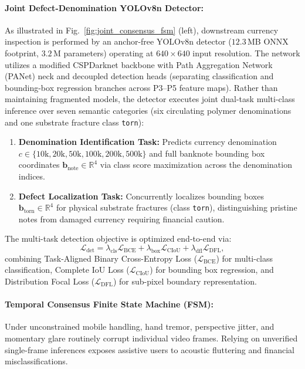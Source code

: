 \documentclass[final,5p,times,twocolumn,authoryear]{elsarticle}
\begin{document}
\paragraph{Joint Defect-Denomination YOLOv8n Detector:}
As illustrated in Fig.~\ref{fig:joint_consensus_fsm} (left), downstream currency inspection is performed by an anchor-free YOLOv8n detector ($12.3$\,MB ONNX footprint, $3.2$\,M parameters) operating at $640 \times 640$ input resolution. The network utilizes a modified CSPDarknet backbone with Path Aggregation Network (PANet) neck and decoupled detection heads (separating classification and bounding-box regression branches across P3--P5 feature maps). Rather than maintaining fragmented models, the detector executes joint dual-task multi-class inference over seven semantic categories (six circulating polymer denominations and one substrate fracture class \texttt{torn}):
\begin{enumerate}[label=(\roman*)]
    \item \textbf{Denomination Identification Task:} Predicts currency denomination $c \in \{10\text{k},\allowbreak 20\text{k},\allowbreak 50\text{k},\allowbreak 100\text{k},\allowbreak 200\text{k},\allowbreak 500\text{k}\}$ and full banknote bounding box coordinates $\mathbf{b}_{\text{note}} \in \mathbb{R}^4$ via class score maximization across the denomination indices.
    \item \textbf{Defect Localization Task:} Concurrently localizes bounding boxes $\mathbf{b}_{\text{torn}} \in \mathbb{R}^4$ for physical substrate fractures (class \texttt{torn}), distinguishing pristine notes from damaged currency requiring financial caution.
\end{enumerate}
The multi-task detection objective is optimized end-to-end via:
\begin{equation}
\mathcal{L}_{\text{det}} = \lambda_{\text{cls}} \mathcal{L}_{\text{BCE}} + \lambda_{\text{box}} \mathcal{L}_{\text{CIoU}} + \lambda_{\text{dfl}} \mathcal{L}_{\text{DFL}},
\end{equation}
combining Task-Aligned Binary Cross-Entropy Loss ($\mathcal{L}_{\text{BCE}}$) for multi-class classification, Complete IoU Loss ($\mathcal{L}_{\text{CIoU}}$) for bounding box regression, and Distribution Focal Loss ($\mathcal{L}_{\text{DFL}}$) for sub-pixel boundary representation.

\paragraph{Temporal Consensus Finite State Machine (FSM):}
Under unconstrained mobile handling, hand tremor, perspective jitter, and momentary glare routinely corrupt individual video frames. Relying on unverified single-frame inferences exposes assistive users to acoustic fluttering and financial misclassifications.
\end{document}

